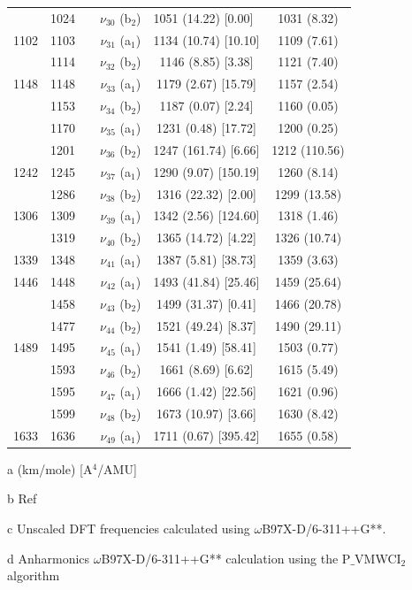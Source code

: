 \begin{table}[H]
\begin{center}
\begin{threeparttable}
\begin{tabular}{c c c c c c}
 & \multicolumn{1}{c}{1024} & \multicolumn{1}{c}{} & \multicolumn{1}{c}{ $\nu_{30}$ (b$_{2}$)} & \multicolumn{1}{l}{1051 (14.22) [0.00]} & 1031 (8.32) \\ 
1102 & 1103 &  & $\nu_{31}$ (a$_{1}$) & 1134 (10.74) [10.10] & 1109 (7.61) \\ 
& 1114 &  & $\nu_{32}$ (b$_{2}$)
& 1146 (8.85) [3.38] & 1121 (7.40)\\ 
1148 & 1148 &  &$\nu_{33}$ (a$_{1}$) & 1179 (2.67) [15.79] & 1157 (2.54) \\ 
& 1153 &  & $\nu_{34}$ (b$_{2}$) & 1187 (0.07) [2.24] & 1160 (0.05) \\ 
& 1170 &  & $\nu_{35}$ (a$_{1}$) & 1231 (0.48) [17.72] & 1200 (0.25) \\ 
& 1201 &  & $\nu_{36}$ (b$_{2}$)& 1247 (161.74) [6.66] & 1212 (110.56)\\ 
1242 & 1245 &  & $\nu_{37}$ (a$_{1}$) & 1290 (9.07) [150.19] & 1260 (8.14) \\ 
& 1286 &  & $\nu_{38}$ (b$_{2}$) & 1316 (22.32) [2.00] & 1299 (13.58) \\ 
1306 & 1309 &  & $\nu_{39}$ (a$_{1}$) &1342 (2.56) [124.60] & 1318 (1.46) \\ 
& 1319 &  & $\nu_{40}$ (b$_{2}$) & 1365 (14.72) [4.22] & 1326 (10.74) \\ 
1339 & 1348 &  & $\nu_{41}$ (a$_{1}$) & 1387 (5.81) [38.73] & 1359 (3.63) \\ 
1446 & 1448 &  & $\nu_{42}$ (a$_{1}$) & 1493 (41.84) [25.46] & 1459 (25.64) \\
& 1458 &  & $\nu_{43}$  (b$_{2}$) & 1499 (31.37) [0.41] & 1466 (20.78) \\ 
& 1477 &  & $\nu_{44}$ (b$_{2}$) & 1521 (49.24) [8.37] & 1490 (29.11) \\ 
1489 & 1495 &  & $\nu_{45}$ (a$_{1}$)& 1541 (1.49) [58.41] & 1503 (0.77)\\ 
& 1593 &  & $\nu_{46}$ (b$_{2}$) & 1661 (8.69) [6.62] & 1615 (5.49) \\ 
& 1595 &  & $\nu_{47}$ (a$_{1}$) & 1666 (1.42) [22.56] & 1621 (0.96) \\
& 1599 &  & $\nu_{48}$ (b$_{2}$) & 1673 (10.97) [3.66] & 1630 (8.42) \\ 
1633 & 1636 &  & $\nu_{49}$ (a$_{1}$) & 1711 (0.67) [395.42] & 1655 (0.58) \\
		\bottomrule		
	\end{tabular}
	
	\begin{tablenotes}
		\item[a] (km/mole) [A$^{4}$/AMU]
		\item[b] Ref \cite{klots1996vibrational}
		\item[c] Unscaled DFT frequencies calculated using $\omega$B97X-D/6-311++G**.
		\item[d] Anharmonics $\omega$B97X-D/6-311++G** calculation using the P$\_$VMWCI$_{2}$ algorithm
	\end{tablenotes}
\end{threeparttable}
\end{center}
\label{freq-Dibenzofuran}
\end{table}
	
